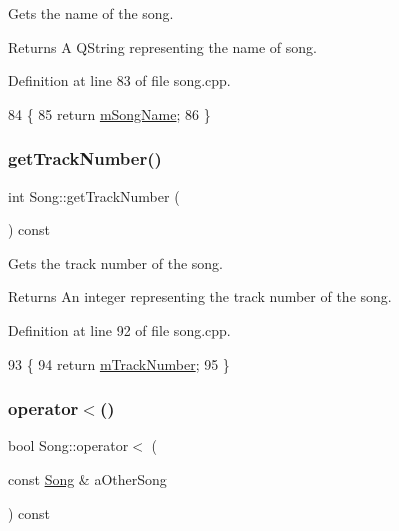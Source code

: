 Gets the name of the song. 

\begin{DoxyReturn}{Returns}
A Q\+String representing the name of song. 
\end{DoxyReturn}


Definition at line 83 of file song.\+cpp.


\begin{DoxyCode}
84 \{
85     \textcolor{keywordflow}{return} \mbox{\hyperlink{class_song_af7fae22fdde85f62397c5a3618e8e573}{mSongName}};
86 \}
\end{DoxyCode}
\mbox{\label{class_song_aafed63304c6f308bb0c55c3ac206ad4a}} 
\subsubsection{\texorpdfstring{get\+Track\+Number()}{getTrackNumber()}}
{\footnotesize\ttfamily int Song\+::get\+Track\+Number (\begin{DoxyParamCaption}{ }\end{DoxyParamCaption}) const}



Gets the track number of the song. 

\begin{DoxyReturn}{Returns}
An integer representing the track number of the song. 
\end{DoxyReturn}


Definition at line 92 of file song.\+cpp.


\begin{DoxyCode}
93 \{
94     \textcolor{keywordflow}{return} \mbox{\hyperlink{class_song_a45f2f019180a08117bc1992f16fdb5f7}{mTrackNumber}};
95 \}
\end{DoxyCode}
\mbox{\label{class_song_a3e7e21ea87a93f305dbfd4cb9e6bf416}} 
\subsubsection{\texorpdfstring{operator$<$()}{operator<()}}
{\footnotesize\ttfamily bool Song\+::operator$<$ (\begin{DoxyParamCaption}\item[{const \mbox{\hyperlink{class_song}{Song}} \&}]{a\+Other\+Song }\end{DoxyParamCaption}) const}



